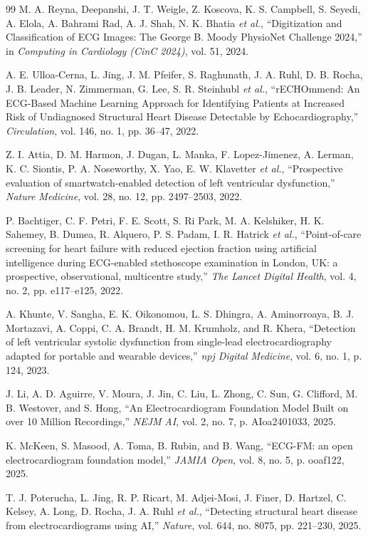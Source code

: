 \begin{thebibliography}{99}
 M. A. Reyna, Deepanshi, J. T. Weigle, Z. Koscova, K. S. Campbell, S. Seyedi, A. Elola, A. Bahrami Rad, A. J. Shah, N. K. Bhatia \emph{et al.}, ``Digitization and Classification of ECG Images: The George B. Moody PhysioNet Challenge 2024,'' in \emph{Computing in Cardiology (CinC 2024)}, vol. 51, 2024.

 A. E. Ulloa-Cerna, L. Jing, J. M. Pfeifer, S. Raghunath, J. A. Ruhl, D. B. Rocha, J. B. Leader, N. Zimmerman, G. Lee, S. R. Steinhubl \emph{et al.}, ``rECHOmmend: An ECG-Based Machine Learning Approach for Identifying Patients at Increased Risk of Undiagnosed Structural Heart Disease Detectable by Echocardiography,'' \emph{Circulation}, vol. 146, no. 1, pp. 36--47, 2022.

 Z. I. Attia, D. M. Harmon, J. Dugan, L. Manka, F. Lopez-Jimenez, A. Lerman, K. C. Siontis, P. A. Noseworthy, X. Yao, E. W. Klavetter \emph{et al.}, ``Prospective evaluation of smartwatch-enabled detection of left ventricular dysfunction,'' \emph{Nature Medicine}, vol. 28, no. 12, pp. 2497--2503, 2022.

 P. Bachtiger, C. F. Petri, F. E. Scott, S. Ri Park, M. A. Kelshiker, H. K. Sahemey, B. Dumea, R. Alquero, P. S. Padam, I. R. Hatrick \emph{et al.}, ``Point-of-care screening for heart failure with reduced ejection fraction using artificial intelligence during ECG-enabled stethoscope examination in London, UK: a prospective, observational, multicentre study,'' \emph{The Lancet Digital Health}, vol. 4, no. 2, pp. e117--e125, 2022.

 A. Khunte, V. Sangha, E. K. Oikonomou, L. S. Dhingra, A. Aminorroaya, B. J. Mortazavi, A. Coppi, C. A. Brandt, H. M. Krumholz, and R. Khera, ``Detection of left ventricular systolic dysfunction from single-lead electrocardiography adapted for portable and wearable devices,'' \emph{npj Digital} \emph{Medicine}, vol. 6, no. 1, p. 124, 2023.

 J. Li, A. D. Aguirre, V. Moura, J. Jin, C. Liu, L. Zhong, C. Sun, G. Clifford, M. B. Westover, and S. Hong, ``An Electrocardiogram Foundation Model Built on over 10 Million Recordings,'' \emph{NEJM} \emph{AI}, vol. 2, no. 7, p. AIoa2401033, 2025.

 K. McKeen, S. Masood, A. Toma, B. Rubin, and B. Wang, ``ECG-FM: an open electrocardiogram foundation model,'' \emph{JAMIA Open}, vol. 8, no. 5, p. ooaf122, 2025.

 T. J. Poterucha, L. Jing, R. P. Ricart, M. Adjei-Mosi, J. Finer, D. Hartzel, C. Kelsey, A. Long, D. Rocha, J. A. Ruhl \emph{et al.}, ``Detecting structural heart disease from electrocardiograms using AI,'' \emph{Nature}, vol. 644, no. 8075, pp. 221--230, 2025.


\end{thebibliography}
